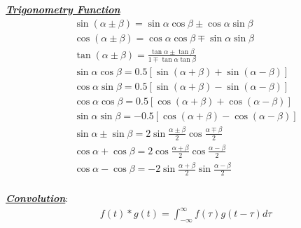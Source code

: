 \documentclass[12pt]{article}
\newcommand{\bulletPoint}[1]{\ul{\textit{\textbf{#1}}}}
\begin{document}
\begin{multicols*}{4}
\bulletPoint{Trigonometry Function}
\useshortskip \begin{equation*}
\begin{split}
        & \sin(\alpha \pm \beta) = \sin \alpha \cos \beta \pm \cos \alpha \sin \beta \\[-3pt]
        & \cos(\alpha \pm \beta) = \cos \alpha \cos \beta \mp \sin \alpha \sin \beta \\[-3pt]
        & \tan(\alpha \pm \beta) = \frac{\tan \alpha \pm \tan \beta}{1 \mp \tan \alpha \tan \beta}\\[-3pt]
        & \sin \alpha \cos \beta = 0.5[\sin(\alpha + \beta) + \sin(\alpha - \beta)]\\
        & \cos \alpha \sin \beta = 0.5[\sin(\alpha + \beta) - \sin(\alpha - \beta)]\\
        & \cos \alpha \cos \beta = 0.5[\cos(\alpha + \beta) + \cos(\alpha - \beta)]\\
        & \sin \alpha \sin \beta = -0.5[\cos(\alpha + \beta) - \cos(\alpha - \beta)]\\[-3pt]
        & \sin \alpha \pm \sin \beta = 2 \sin\frac{\alpha \pm \beta}{2} \cos\frac{\alpha \mp \beta}{2}\\[-3pt]
        & \cos \alpha + \cos \beta = 2 \cos\frac{\alpha + \beta}{2} \cos\frac{\alpha - \beta}{2}\\[-3pt]
        & \cos \alpha - \cos \beta = - 2 \sin\frac{\alpha + \beta}{2} \sin\frac{\alpha - \beta}{2}\\[-9pt]
\end{split}
\end{equation*}


\bulletPoint{Convolution}:
\useshortskip \begin{equation*}
    \begin{split}
        & f(t) * g(t) = \int^{\infty}_{-\infty}f(\tau)g(t-\tau)d\tau\\[-10pt]
    \end{split}
\end{equation*}


\end{multicols*}
\end{document}
